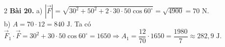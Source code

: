 \documentclass[12pt,a4paper]{article}
\begin{document}
\begin{multicols}{2}
\textbf{Bài 20.} a) $|\vec{F}| = \sqrt{30^2 + 50^2 + 2\cdot 30\cdot 50\cos 60^\circ} = \sqrt{4900} = 70\text{ N}$.\\
b) $A = 70 \cdot 12 = 840\text{ J}$. Ta có $\vec{F}_1\cdot\vec{F} = 30^2 + 30\cdot 50\cos 60^\circ = 1650 \Rightarrow A_1 = \dfrac{12}{70}\cdot 1650 = \dfrac{1980}{7} \approx 282{,}9\text{ J}$.

\end{multicols}
\end{document}
